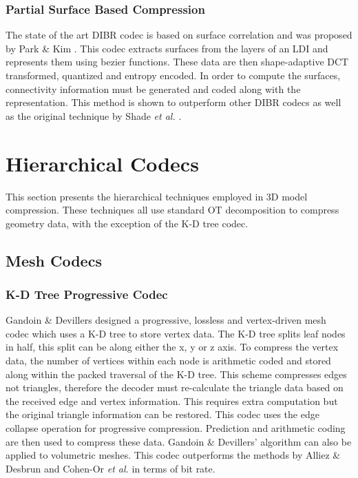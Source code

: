 
\subsubsection{Partial Surface Based Compression}

The state of the art DIBR codec is based on surface correlation and was proposed by Park \& Kim \cite{Park10Efficient}. This codec extracts surfaces from the layers of an LDI and represents them using bezier functions. These data are then shape-adaptive DCT transformed, quantized and entropy encoded. In order to compute the surfaces, connectivity information must be generated and coded along with the representation. This method is shown to outperform other DIBR codecs as well as the original technique by Shade \textit{et al.}  \cite{Shade98Layered}.

\section{Hierarchical Codecs}

This section presents the hierarchical techniques employed in 3D model compression. These techniques all use standard OT decomposition to compress geometry data, with the exception of the K-D tree codec.

\subsection{Mesh Codecs}

\subsubsection{K-D Tree Progressive Codec}

Gandoin \& Devillers \cite{Gandoin02Progressive} designed a progressive, lossless and vertex-driven mesh codec  which uses a K-D tree to store vertex data. The K-D tree splits leaf nodes in half, this split can be along either the x, y or z axis. To compress the vertex data, the number of vertices within each node is arithmetic coded and stored along within the packed traversal of the K-D tree. This scheme compresses edges not triangles, therefore the decoder must re-calculate the triangle data based on the received edge and vertex information. This requires extra computation but the original triangle information can be restored. This codec uses the edge collapse operation for progressive compression. Prediction and arithmetic coding are then used to compress these data. Gandoin \& Devillers' algorithm can also be applied to volumetric meshes. This codec outperforms the methods by Alliez \& Desbrun \cite{Alliez01Progressive} and Cohen-Or \textit{et al.} \cite{CohenOr99Progressive} in terms of bit rate.

